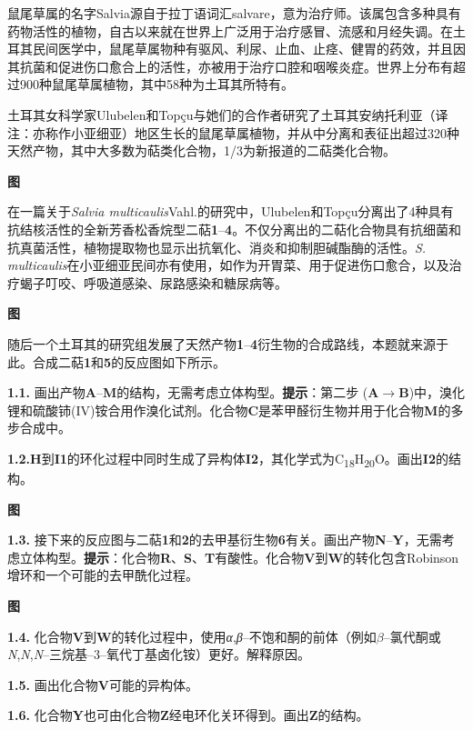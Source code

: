 鼠尾草属的名字Salvia源自于拉丁语词汇salvare，意为治疗师。该属包含多种具有药物活性的植物，自古以来就在世界上广泛用于治疗感冒、流感和月经失调。在土耳其民间医学中，鼠尾草属物种有驱风、利尿、止血、止痉、健胃的药效，并且因其抗菌和促进伤口愈合上的活性，亦被用于治疗口腔和咽喉炎症。世界上分布有超过900种鼠尾草属植物，其中58种为土耳其所特有。

土耳其女科学家Ulubelen和Topçu与她们的合作者研究了土耳其安纳托利亚（译注：亦称作小亚细亚）地区生长的鼠尾草属植物，并从中分离和表征出超过320种天然产物，其中大多数为萜类化合物，1/3为新报道的二萜类化合物。

\textbf{图}

在一篇关于\emph{Salvia multicaulis}Vahl.的研究中，Ulubelen和Topçu分离出了4种具有抗结核活性的全新芳香松香烷型二萜\textbf{1}--\textbf{4}。不仅分离出的二萜化合物具有抗细菌和抗真菌活性，植物提取物也显示出抗氧化、消炎和抑制胆碱酯酶的活性。\emph{S. multicaulis}在小亚细亚民间亦有使用，如作为开胃菜、用于促进伤口愈合，以及治疗蝎子叮咬、呼吸道感染、尿路感染和糖尿病等。

\textbf{图}

随后一个土耳其的研究组发展了天然产物\textbf{1}--\textbf{4}衍生物的合成路线，本题就来源于此。合成二萜\textbf{1}和\textbf{5}的反应图如下所示。

\noindent\textbf{1.1.} 画出产物\textbf{A}--\textbf{M}的结构，无需考虑立体构型。\textbf{提示}：第二步 (\textbf{A}$\rightarrow$\textbf{B})中，溴化锂和硫酸铈(IV)铵合用作溴化试剂。化合物\textbf{C}是苯甲醛衍生物并用于化合物\textbf{M}的多步合成中。

\noindent\textbf{1.2.}\textbf{H}到\textbf{I1}的环化过程中同时生成了异构体\textbf{I2}，其化学式为C\textsubscript{18}H\textsubscript{20}O。画出\textbf{I2}的结构。


\textbf{图}

\noindent\textbf{1.3.} 接下来的反应图与二萜\textbf{1}和\textbf{2}的去甲基衍生物\textbf{6}有关。画出产物\textbf{N}--\textbf{Y}，无需考虑立体构型。\textbf{提示}：化合物\textbf{R}、\textbf{S}、\textbf{T}有酸性。化合物\textbf{V}到\textbf{W}的转化包含Robinson增环和一个可能的去甲酰化过程。

\textbf{图}

\noindent\textbf{1.4.} 化合物\textbf{V}到\textbf{W}的转化过程中，使用\emph{α},\emph{β}--不饱和酮的前体（例如$\beta$--氯代酮或\emph{N},\emph{N},\emph{N}--三烷基--3--氧代丁基卤化铵）更好。解释原因。

\noindent\textbf{1.5.} 画出化合物\textbf{V}可能的异构体。

\noindent\textbf{1.6.} 化合物\textbf{Y}也可由化合物\textbf{Z}经电环化关环得到。画出\textbf{Z}的结构。

